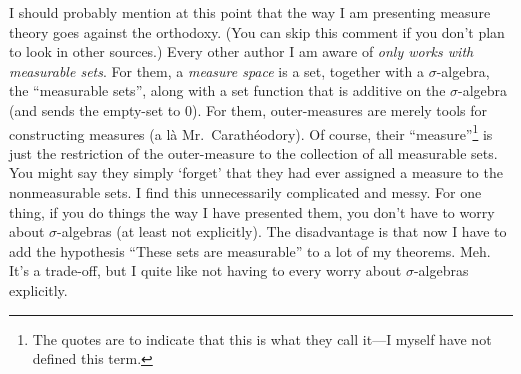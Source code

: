 \begin{displayquote}
I should probably mention at this point that the way I am presenting measure theory goes against the orthodoxy.  (You can skip this comment if you don't plan to look in other sources.)  Every other author I am aware of \emph{only works with measurable sets}.  For them, a \emph{measure space} is a set, together with a $\sigma$-algebra, the ``measurable sets'', along with a set function that is additive on the $\sigma$-algebra (and sends the empty-set to $0$).  For them, outer-measures are merely tools for constructing measures (a l\`{a} Mr.~Carath\'{e}odory).  Of course, their ``measure''\footnote{The quotes are to indicate that this is what they call it---I myself have not defined this term.} is just the restriction of the outer-measure to the collection of all measurable sets.  You might say they simply `forget' that they had ever assigned a measure to the nonmeasurable sets.  I find this unnecessarily complicated and messy.  For one thing, if you do things the way I have presented them, you don't have to worry about $\sigma$-algebras (at least not explicitly).  The disadvantage is that now I have to add the hypothesis ``These sets are measurable'' to a lot of my theorems.  Meh.  It's a trade-off, but I quite like not having to every worry about $\sigma$-algebras explicitly.
\end{displayquote}

